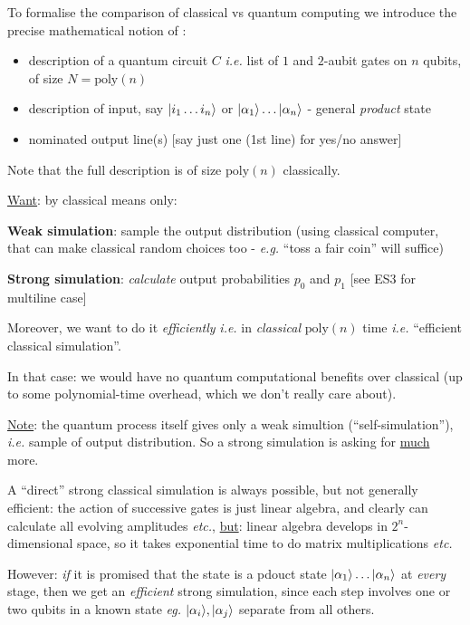 \documentclass[]{article}
\renewcommand{\it}[1]{\textit{#1}}
\newcommand{\poly}{\textrm{poly}}
\begin{document}
To formalise the comparison of classical vs quantum computing we introduce the precise mathematical notion of :
\begin{itemize}
	\item description of a quantum circuit $C$ \it{i.e.} list of $1$ and $2$-aubit gates on $n$ qubits, of size $N = \poly(n)$
	\item description of input, say $\lvert i_1\dots i_n\rangle$ or $\lvert\alpha_1\rangle\dots\lvert\alpha_n\rangle$ - general \it{product} state
	\item nominated output line(s) [say just one (1st line) for yes/no answer]
\end{itemize}
Note that the full description is of size $\poly(n)$ classically.

\underline{Want}: by classical means only:

\textbf{Weak simulation}: sample the output distribution (using classical computer, that can make classical random choices too - \it{e.g.} ``toss a fair coin'' will suffice)

\textbf{Strong simulation}: \it{calculate} output probabilities $p_0$ and $p_1$ [see ES3 for multiline case]

Moreover, we want to do it \it{efficiently} \it{i.e.} in \it{classical} $\poly(n)$ time \it{i.e.} ``efficient classical simulation''.

In that case: we would have no quantum computational benefits over classical (up to some polynomial-time overhead, which we don't really care about).

\underline{Note}: the quantum process itself gives only a weak simultion (``self-simulation''), \it{i.e.} sample of output distribution. So a strong simulation is asking for \underline{much} more.

A ``direct'' strong classical simulation is always possible, but not generally efficient: the action of successive gates is just linear algebra, and clearly can calculate all evolving amplitudes \it{etc.}, \underline{but}: linear algebra develops in $2^n$-dimensional space, so it takes exponential time to do matrix multiplications \it{etc.}

However: \it{if} it is promised that the state is a pdouct state $\lvert\alpha_1\rangle\dots\lvert\alpha_n\rangle$ at \it{every} stage, then we get an \it{efficient} strong simulation, since each step involves one or two qubits in a known state \it{eg.} $\lvert\alpha_i\rangle,\lvert\alpha_j\rangle$ separate from all others.
\end{document}
